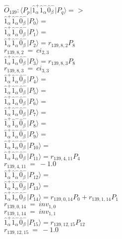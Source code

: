 \documentclass[14pt]{article}
\begin{document}
    $\hat{O}_{139}:  \langle{P_p}\vert \hat{1}_{\alpha}^{+}\hat{1}_{\alpha}^{-}\hat{0}_{\beta}^{-} \vert{P_q}\rangle => $ \\ 
    $ \hat{1}_{\alpha}^{+}\hat{1}_{\alpha}^{-}\hat{0}_{\beta}^{-} \vert{P_{0}}\rangle =  $ \\ 
    $ \hat{1}_{\alpha}^{+}\hat{1}_{\alpha}^{-}\hat{0}_{\beta}^{-} \vert{P_{1}}\rangle =  $ \\ 
    $ \hat{1}_{\alpha}^{+}\hat{1}_{\alpha}^{-}\hat{0}_{\beta}^{-} \vert{P_{2}}\rangle = {r}_{139,8,2}P_{8} $ \\ 
    ${r}_{139,8,2}\ =\ {ci}_{2,3} $ \\ 
    $ \hat{1}_{\alpha}^{+}\hat{1}_{\alpha}^{-}\hat{0}_{\beta}^{-} \vert{P_{3}}\rangle = {r}_{139,8,3}P_{8} $ \\ 
    ${r}_{139,8,3}\ =\ {ci}_{3,3} $ \\ 
    $ \hat{1}_{\alpha}^{+}\hat{1}_{\alpha}^{-}\hat{0}_{\beta}^{-} \vert{P_{4}}\rangle =  $ \\ 
    $ \hat{1}_{\alpha}^{+}\hat{1}_{\alpha}^{-}\hat{0}_{\beta}^{-} \vert{P_{5}}\rangle =  $ \\ 
    $ \hat{1}_{\alpha}^{+}\hat{1}_{\alpha}^{-}\hat{0}_{\beta}^{-} \vert{P_{6}}\rangle =  $ \\ 
    $ \hat{1}_{\alpha}^{+}\hat{1}_{\alpha}^{-}\hat{0}_{\beta}^{-} \vert{P_{7}}\rangle =  $ \\ 
    $ \hat{1}_{\alpha}^{+}\hat{1}_{\alpha}^{-}\hat{0}_{\beta}^{-} \vert{P_{8}}\rangle =  $ \\ 
    $ \hat{1}_{\alpha}^{+}\hat{1}_{\alpha}^{-}\hat{0}_{\beta}^{-} \vert{P_{9}}\rangle =  $ \\ 
    $ \hat{1}_{\alpha}^{+}\hat{1}_{\alpha}^{-}\hat{0}_{\beta}^{-} \vert{P_{10}}\rangle =  $ \\ 
    $ \hat{1}_{\alpha}^{+}\hat{1}_{\alpha}^{-}\hat{0}_{\beta}^{-} \vert{P_{11}}\rangle = {r}_{139,4,11}P_{4} $ \\ 
    ${r}_{139,4,11}\ =\ -1.0 $ \\ 
    $ \hat{1}_{\alpha}^{+}\hat{1}_{\alpha}^{-}\hat{0}_{\beta}^{-} \vert{P_{12}}\rangle =  $ \\ 
    $ \hat{1}_{\alpha}^{+}\hat{1}_{\alpha}^{-}\hat{0}_{\beta}^{-} \vert{P_{13}}\rangle =  $ \\ 
    $ \hat{1}_{\alpha}^{+}\hat{1}_{\alpha}^{-}\hat{0}_{\beta}^{-} \vert{P_{14}}\rangle = {r}_{139,0,14}P_{0}+{r}_{139,1,14}P_{1} $ \\ 
    ${r}_{139,0,14}\ =\ {inv}_{1,0} $ \\ 
    ${r}_{139,1,14}\ =\ {inv}_{1,1} $ \\ 
    $ \hat{1}_{\alpha}^{+}\hat{1}_{\alpha}^{-}\hat{0}_{\beta}^{-} \vert{P_{15}}\rangle = {r}_{139,12,15}P_{12} $ \\ 
    ${r}_{139,12,15}\ =\ -1.0 $ \\ 
    
\end{document}
